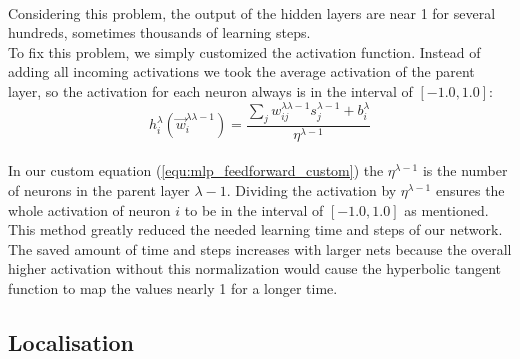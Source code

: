 \documentclass[lnicst,a4paper]{svmultln}
\begin{document}
\\
Considering this problem, the output of the hidden layers are near 1 for several hundreds, sometimes thousands of learning steps.
\\
To fix this problem, we simply customized the activation function. Instead of adding all incoming activations we took the average activation of the parent layer, so the activation for each neuron always is in the interval of $[-1.0, 1.0]$:
\\
\begin{equation}
\label{equ:mlp_feedforward_custom}
h_{i}^{\lambda} (\vec{w}_{i}^{\lambda \lambda-1})
=
\frac{
\sum\limits_{j} w_{ij}^{\lambda \lambda-1} s_{j}^{\lambda-1} + b_{i}^{\lambda}
}
{\eta^{\lambda-1}}
\end{equation}
\\
In our custom equation (\ref{equ:mlp_feedforward_custom}) the $\eta^{\lambda-1}$ is the number of neurons in the parent layer $\lambda-1$. Dividing the activation by $\eta^{\lambda-1}$ ensures the whole activation of neuron $i$ to be in the interval of $[-1.0, 1.0]$ as mentioned.
\\
This method greatly reduced the needed learning time and steps of our network. The saved amount of time and steps increases with larger nets because the overall higher activation without this normalization would cause the hyperbolic tangent function to map the values nearly 1 for a longer time.





\subsection{Localisation}
\label{sec:solutions_localisation}
\end{document}
